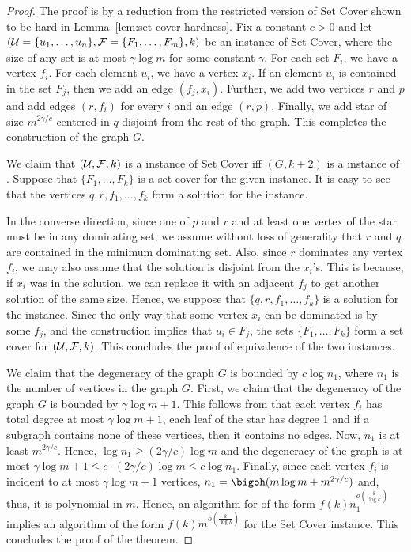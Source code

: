 \begin{proof}
The proof is by a reduction from the restricted version of {\sc Set Cover} shown to be hard in Lemma~\ref{lem:set cover hardness}. Fix a constant $c>0$ and let $({\cal U}=\{u_1,\dots,u_n\},{\cal F}=\{F_1,\dots,F_m\},k)$ be an instance of {\sc Set Cover}, where the size of any set is at most $\gamma \log m$ for some constant $\gamma$. For each set $F_i$, we have a vertex $f_i$. For each element $u_i$, we have a vertex $x_i$. If an element $u_i$ is contained in the set $F_j$, then we add an edge $(f_j,x_i)$. Further, we add two vertices $r$ and $p$ and add edges $(r,f_i)$ for every $i$ and an edge $(r,p)$. Finally, we add star of size $m^{2\gamma/c}$ centered in $q$ disjoint from the rest of the graph. This completes the construction of the graph $G$. 

We claim that $({\cal U}, {\cal F}, k)$ is a {\Yes} instance of {\sc Set Cover} iff $(G,k+2)$ is a {\Yes} instance of {\ds}. Suppose that $\{F_1,\dots,F_k\}$ is a set cover for the given instance. It is easy to see that the vertices $q,r,f_1,\dots, f_k$ form a solution for the {\ds} instance.

In the converse direction, since one of $p$ and $r$ and at least one vertex of the star must be in any dominating set, we assume without loss of generality that $r$ and $q$ are contained in the minimum dominating set. Also, since $r$ dominates any vertex $f_i$, we may also assume that the solution is disjoint from the $x_i$'s. This is because, if $x_i$ was in the solution, we can replace it with an adjacent $f_j$ to get another solution of the same size. Hence, we suppose that $\{q,r,f_1,\dots, f_k\}$ is a solution for the {\ds} instance. Since the only way that some vertex $x_i$ can be dominated is by some $f_j$, and the construction implies that $u_i\in F_j$, the sets $\{F_1,\dots, F_k\}$ form a set cover for $({\cal U}, {\cal F}, k)$. This concludes the proof of equivalence of the two instances.

We claim that the degeneracy of the graph $G$ is bounded by $c \log  n_1$, where $n_1$ is the number of vertices in the graph $G$. First, we claim that the degeneracy of the graph $G$ is bounded by $\gamma \log m+1$. This follows from that each vertex $f_i$ has total degree at most $\gamma \log m +1$, each leaf of the star has degree 1 and if a subgraph contains none of these vertices, then it contains no edges.  Now, $n_1$ is at least $m^{2\gamma/c}$. Hence, $\log n_1  \geq (2\gamma/c)\log m$ and the degeneracy of the graph is at most $\gamma \log m +1 \leq c \cdot (2\gamma/c) \log m \leq c \log n_1$. Finally, since each vertex $f_i$ is incident to at most $\gamma \log m +1$ vertices, $n_1=\bigoh(m \log m + m^{2\gamma/c})$ and, thus, it is polynomial in $m$. Hence, an algorithm for {\ds} of the form $f(k)n_1^{o(\frac{k}{\log k})}$ implies an algorithm of the form $f(k)m^{o(\frac{k}{\log k})}$ for the {\sc Set Cover} instance. This concludes the proof of the theorem.
\end{proof}



